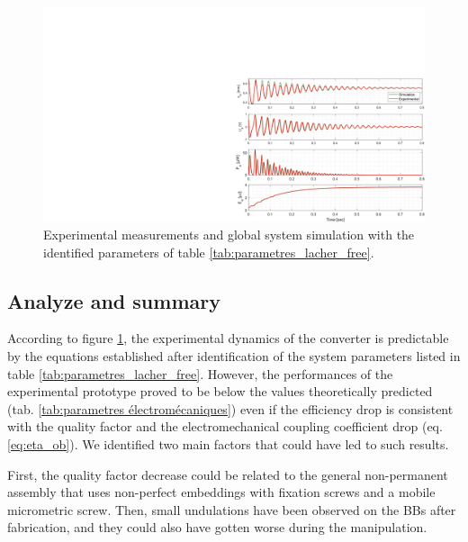 \documentclass[3p,twocolumn,preprint]{elsarticle}
\begin{document}
\begin{figure}[!htbp]
	\centering
	\captionsetup{justification=centering}
	\includegraphics[trim={17cm 0cm 0cm 6cm},clip,width=\linewidth]{figures/correlation_simu-exp_OB+GPA.pdf}
	\caption{Experimental measurements and global system simulation with the identified parameters of table \ref{tab:parametres_lacher_free}.}
	\label{fig:BDT_OB+GPA}
\end{figure}

	\subsection{Analyze and summary}	
	\label{subsec:Analyze and summary}

According to figure \ref{fig:BDT_OB+GPA}, the experimental dynamics of the converter is predictable by the equations established after identification of the system parameters listed in table \ref{tab:parametres_lacher_free}. However, the performances of the experimental prototype proved to be below the values theoretically predicted (tab. \ref{tab:parametres électromécaniques}) even if the efficiency drop is consistent with the quality factor and the electromechanical coupling coefficient drop (eq. \ref{eq:eta_ob}). We identified two main factors that could have led to such results. 

First, the quality factor decrease could be related to the general non-permanent assembly that uses non-perfect embeddings with fixation screws and a mobile micrometric screw. 
Then, small undulations have been observed on the BBs after fabrication, and they could also have gotten worse during the manipulation.
\end{document}
